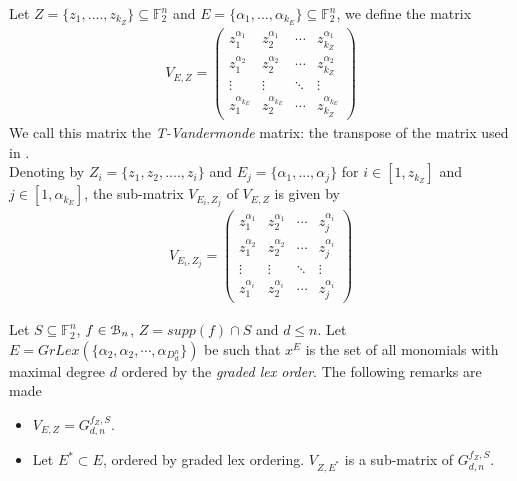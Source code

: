 \documentclass[11pt]{llncs}
\begin{document}
\begin{definition}\label{def:tVandermonde}
    Let $Z = \{z_1, ...., z_{k_Z}\} \subseteq \mathbb{F}_2^n$ and $E = \{\alpha_1, ..., \alpha_{k_E}\}\subseteq \mathbb{F}_2^n$, we define the matrix
    \begin{align*}
        V_{E,Z} = 
        \begin{pmatrix}
            z_1^{\alpha_1} & z_2^{\alpha_1} & \cdots & z_{k_Z}^{\alpha_1} \\
            z_1^{\alpha_2} & z_2^{\alpha_2} & \cdots & z_{k_Z}^{\alpha_2} \\
            \vdots & \vdots & \ddots & \vdots \\
            z_1^{\alpha_{k_E}} & z_2^{\alpha_{k_E}} & \cdots & z_{k_Z}^{\alpha_{k_E}}
        \end{pmatrix}
    \end{align*}
    We call this matrix the \textit{T-Vandermonde} matrix: the transpose of the matrix used in \cite{armknecht2006efficient}.\\
    Denoting by $Z_i = \{z_1, z_2, ...., z_i\}$ and $E_j = \{\alpha_1, ..., \alpha_j\}$ for $i\in[1,z_{k_Z}]$ and $j\in[1,\alpha_{k_E}]$, the sub-matrix $V_{E_i, Z_j}$ of $V_{E,Z}$ is given by
    \begin{align*}
        V_{E_i,Z_j} = 
        \begin{pmatrix}
            z_1^{\alpha_1} & z_2^{\alpha_1} & \cdots & z_j^{\alpha_{i}} \\
            z_1^{\alpha_2} & z_2^{\alpha_2} & \cdots & z_j^{\alpha_{i}} \\
            \vdots & \vdots & \ddots & \vdots \\
            z_{1}^{\alpha_i} & z_{2}^{\alpha_i} & \cdots & z_{j}^{\alpha_i}
        \end{pmatrix}
    \end{align*}
\end{definition}

\begin{remark}\label{rem:subsetOfReedMuller}
    Let $S\subseteq \mathbb{F}_2^n$, $f \in \mathcal{B}_{n}$, $Z = supp(f) \cap S$ and $d \leq n$. Let $E = GrLex(\{\alpha_2, \alpha_2, \cdots, \alpha_{D_d^n}\})$ be such that $x^E$ is the set of all monomials with maximal degree $d$ ordered by the \textit{graded lex order}. The following remarks are made
    \begin{itemize}
        \item $V_{E,Z} = G_{d,n}^{f_{Z},S}$.
        \item Let $E^{*}\subset E$, ordered by graded lex ordering. $V_{Z,E^{*}}$ is a sub-matrix of $G_{d,n}^{f_Z, S}$.
    \end{itemize}
\end{remark}
\end{document}
